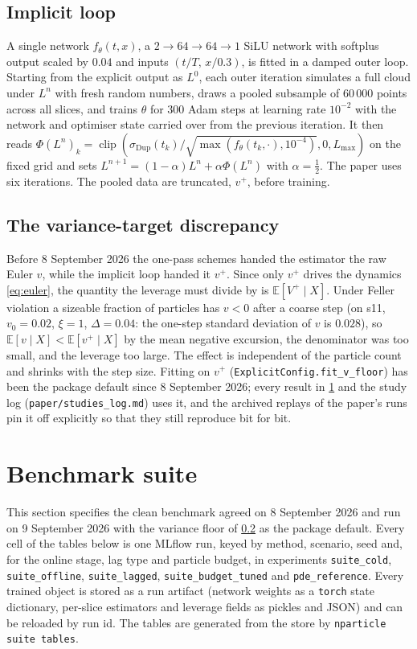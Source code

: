 \documentclass[11pt,a4paper]{article}
\newcommand{\E}{\mathbb{E}}
\newcommand{\sigDup}{\sigma_{\mathrm{Dup}}}
\newcommand{\Lev}{L}
\newcommand{\Lmax}{L_{\max}}
\newcommand{\code}[1]{\texttt{#1}}
\begin{document}
\subsection{Implicit loop}\label{sec:implicit}

A single network $f_\theta(t,x)$, a $2\to64\to64\to1$ SiLU network with softplus output scaled by $0.04$ and inputs $(t/T,\,x/0.3)$, is fitted in a damped outer loop. Starting from the explicit output as $\Lev^0$, each outer iteration simulates a full cloud under $\Lev^n$ with fresh random numbers, draws a pooled subsample of $60\,000$ points across all slices, and trains $\theta$ for $300$ Adam steps at learning rate $10^{-2}$ with the network and optimiser state carried over from the previous iteration. It then reads $\Phi(\Lev^n)_k=\operatorname{clip}(\sigDup(t_k)/\sqrt{\max(f_\theta(t_k,\cdot),10^{-4})},0,\Lmax)$ on the fixed grid and sets $\Lev^{n+1}=(1-\alpha)\Lev^n+\alpha\Phi(\Lev^n)$ with $\alpha=\tfrac12$. The paper uses six iterations. The pooled data are truncated, $v^+$, before training.

\subsection{The variance-target discrepancy}\label{sec:floor}

Before 8 September 2026 the one-pass schemes handed the estimator the raw Euler $v$, while the implicit loop handed it $v^+$. Since only $v^+$ drives the dynamics \cref{eq:euler}, the quantity the leverage must divide by is $\E[V^+\mid X]$. Under Feller violation a sizeable fraction of particles has $v<0$ after a coarse step (on s11, $v_0=0.02$, $\xi=1$, $\Delta=0.04$: the one-step standard deviation of $v$ is $0.028$), so $\E[v\mid X]<\E[v^+\mid X]$ by the mean negative excursion, the denominator was too small, and the leverage too large. The effect is independent of the particle count and shrinks with the step size. Fitting on $v^+$ (\code{ExplicitConfig.fit\_v\_floor}) has been the package default since 8 September 2026; every result in \cref{sec:suite} and the study log (\code{paper/studies\_log.md}) uses it, and the archived replays of the paper's runs pin it off explicitly so that they still reproduce bit for bit.

\section{Benchmark suite}\label{sec:suite}

This section specifies the clean benchmark agreed on 8 September 2026 and run on 9 September 2026 with the variance floor of \cref{sec:floor} as the package default. Every cell of the tables below is one MLflow run, keyed by method, scenario, seed and, for the online stage, lag type and particle budget, in experiments \code{suite\_cold}, \code{suite\_offline}, \code{suite\_lagged}, \code{suite\_budget\_tuned} and \code{pde\_reference}. Every trained object is stored as a run artifact (network weights as a \code{torch} state dictionary, per-slice estimators and leverage fields as pickles and JSON) and can be reloaded by run id. The tables are generated from the store by \code{nparticle suite tables}.
\end{document}
